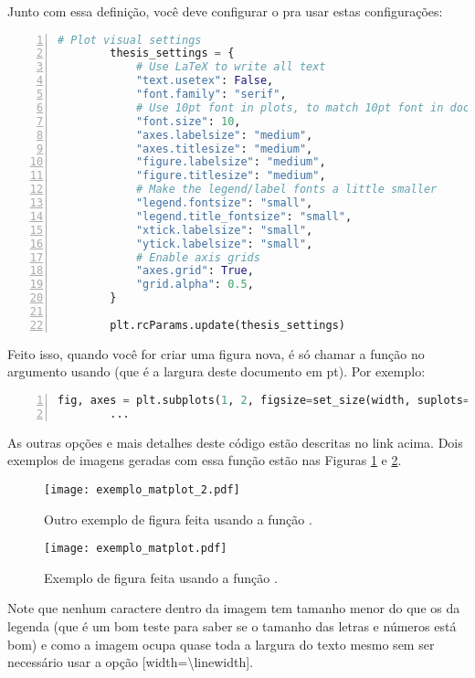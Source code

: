       Junto com essa definição, você deve configurar o  pra usar estas configurações:
      \begin{lstlisting}[label=code, language=Python, numbers=left, autogobble]          
        # Plot visual settings
        thesis_settings = {
            # Use LaTeX to write all text
            "text.usetex": False,
            "font.family": "serif",
            # Use 10pt font in plots, to match 10pt font in document
            "font.size": 10,
            "axes.labelsize": "medium",
            "axes.titlesize": "medium",
            "figure.labelsize": "medium",
            "figure.titlesize": "medium",
            # Make the legend/label fonts a little smaller
            "legend.fontsize": "small",
            "legend.title_fontsize": "small",
            "xtick.labelsize": "small",
            "ytick.labelsize": "small",
            # Enable axis grids
            "axes.grid": True,
            "grid.alpha": 0.5,
        }

        plt.rcParams.update(thesis_settings)
      \end{lstlisting}

      Feito isso, quando você for criar uma figura nova, é só chamar a função no argumento  usando  (que é a largura deste documento em pt). Por exemplo:
      \begin{lstlisting}[label=code, language=Python, numbers=left, autogobble]          
        fig, axes = plt.subplots(1, 2, figsize=set_size(width, suplots=(1, 2), fraction=1))
        ...
      \end{lstlisting}

      As outras opções e mais detalhes deste código estão descritas no link acima. Dois exemplos de imagens geradas com essa função estão nas Figuras \ref{fig:matplot_1} e \ref{fig:matplot_2}.
      \begin{figure}[h]
        \centering
        \texttt{[image: exemplo\_matplot\_2.pdf]}
        \caption{Outro exemplo de figura feita usando a função .}
        \label{fig:matplot_1}
      \end{figure}
      \begin{figure}[h]
        \centering
        \texttt{[image: exemplo\_matplot.pdf]}
        \caption{Exemplo de figura feita usando a função .}
        \label{fig:matplot_2}
      \end{figure}

      Note que nenhum caractere dentro da imagem tem tamanho menor do que os da legenda (que é um bom teste para saber se o tamanho das letras e números está bom) e como a imagem ocupa quase toda a largura do texto mesmo sem ser necessário usar a opção [width=\textbackslash linewidth].

